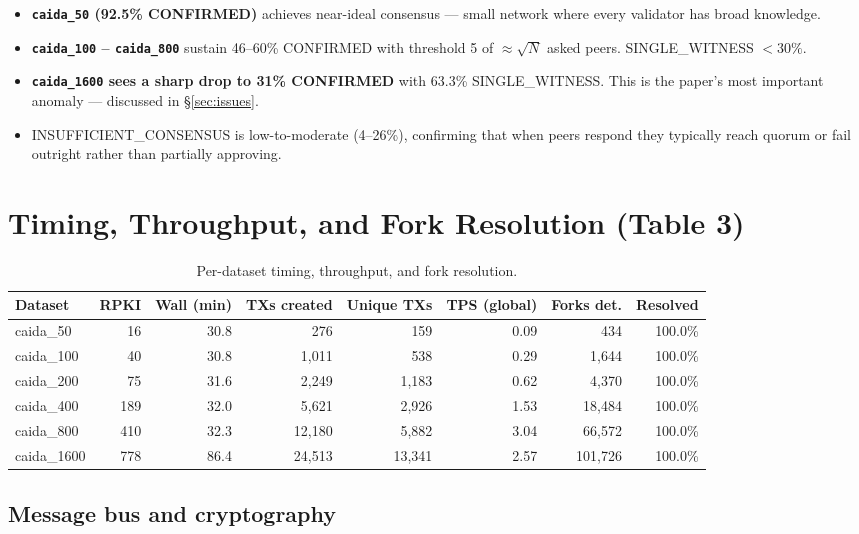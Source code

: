 \documentclass[10pt,a4paper]{article}
\begin{document}
\begin{itemize}
\item \textbf{\texttt{caida\_50} (92.5\% CONFIRMED)} achieves near-ideal consensus --- small network where every validator has broad knowledge.
\item \textbf{\texttt{caida\_100} -- \texttt{caida\_800}} sustain 46--60\% CONFIRMED with threshold 5 of $\approx\sqrt{N}$ asked peers. SINGLE\_WITNESS $<30\%$.
\item \textbf{\texttt{caida\_1600} sees a sharp drop to 31\% CONFIRMED} with 63.3\% SINGLE\_WITNESS. This is the paper's most important anomaly --- discussed in §\ref{sec:issues}.
\item INSUFFICIENT\_CONSENSUS is low-to-moderate (4--26\%), confirming that when peers respond they typically reach quorum or fail outright rather than partially approving.
\end{itemize}

\newpage
\section{Timing, Throughput, and Fork Resolution (Table 3)}
\label{sec:timing}

\begin{table}[h]
\centering
\caption{Per-dataset timing, throughput, and fork resolution.}
\small
\begin{tabular}{lrrrrrrr}
\toprule
Dataset & RPKI & Wall (min) & TXs created & Unique TXs & TPS (global) & Forks det. & Resolved \\
\midrule

caida\_50 & 16 & 30.8 & 276 & 159 & 0.09 & 434 & 100.0\% \\
caida\_100 & 40 & 30.8 & 1,011 & 538 & 0.29 & 1,644 & 100.0\% \\
caida\_200 & 75 & 31.6 & 2,249 & 1,183 & 0.62 & 4,370 & 100.0\% \\
caida\_400 & 189 & 32.0 & 5,621 & 2,926 & 1.53 & 18,484 & 100.0\% \\
caida\_800 & 410 & 32.3 & 12,180 & 5,882 & 3.04 & 66,572 & 100.0\% \\
caida\_1600 & 778 & 86.4 & 24,513 & 13,341 & 2.57 & 101,726 & 100.0\% \\
\bottomrule
\end{tabular}
\end{table}

\subsection{Message bus and cryptography}
\end{document}
